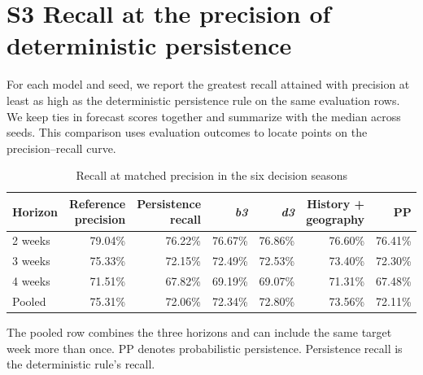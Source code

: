 \documentclass[10pt]{article}
\newcommand{\bthree}{\textit{b3}}
\newcommand{\dthree}{\textit{d3}}
\begin{document}
\clearpage
\section*{S3 Recall at the precision of deterministic persistence}
For each model and seed, we report the greatest recall attained with precision at least as high as the deterministic persistence rule on the same evaluation rows. We keep ties in forecast scores together and summarize with the median across seeds. This comparison uses evaluation outcomes to locate points on the precision--recall curve.

\begin{table}[!h]
\centering
\caption{Recall at matched precision in the six decision seasons}
\small
\begin{tabular}{@{}lrrrrrr@{}}
\toprule
Horizon & Reference precision & Persistence recall & \bthree{} & \dthree{} & History + geography & PP\\
\midrule
2 weeks & 79.04\% & 76.22\% & 76.67\% & 76.86\% & 76.60\% & 76.41\%\\
3 weeks & 75.33\% & 72.15\% & 72.49\% & 72.53\% & 73.40\% & 72.30\%\\
4 weeks & 71.51\% & 67.82\% & 69.19\% & 69.07\% & 71.31\% & 67.48\%\\
Pooled & 75.31\% & 72.06\% & 72.34\% & 72.80\% & 73.56\% & 72.11\%\\
\bottomrule
\end{tabular}

\vspace{2pt}\parbox{0.85\textwidth}{\footnotesize The pooled row combines the three horizons and can include the same target week more than once. PP denotes probabilistic persistence. Persistence recall is the deterministic rule's recall.}
\end{table}
\end{document}
